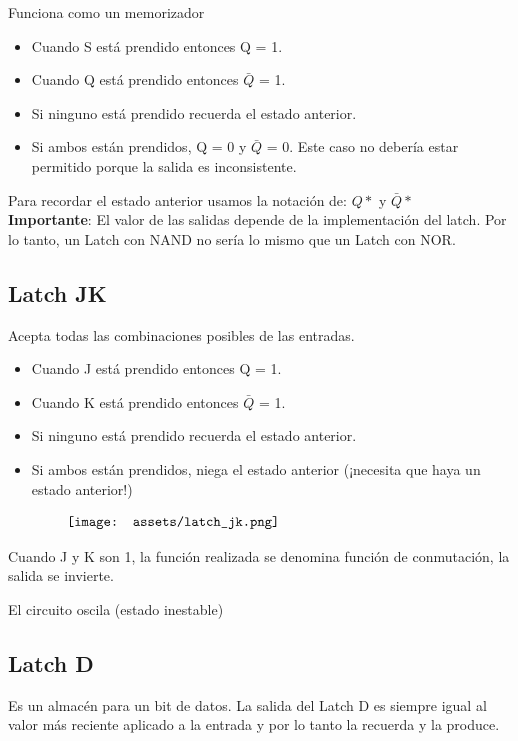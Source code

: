 \documentclass[10pt,a4paper]{article}
\begin{document}
Funciona como un memorizador
\begin{itemize}
    \item Cuando S está prendido entonces Q = 1.
    \item Cuando Q está prendido entonces \(\bar{Q}\) = 1.
    \item Si ninguno está prendido recuerda el estado anterior. 
    \item Si ambos están prendidos, Q = 0 y \(\bar{Q}\) = 0. Este caso no debería estar permitido porque la salida es inconsistente.
\end{itemize}

Para recordar el estado anterior usamos la notación de: \(Q \ast\) y \(\bar{Q} \ast \) \\

\textbf{Importante}: El valor de las salidas depende de la implementación del latch. Por lo tanto, un Latch con NAND no sería lo mismo que un Latch con NOR.

\subsection*{Latch JK}
Acepta todas las combinaciones posibles de las entradas.
\begin{itemize}
    \item Cuando J está prendido entonces Q = 1.
    \item Cuando K está prendido entonces \(\bar{Q}\) = 1.
    \item Si ninguno está prendido recuerda el estado anterior. 
    \item Si ambos están prendidos, niega el estado anterior (¡necesita que haya un estado anterior!)
\end{itemize}

\[\begin{minipage}[b]{0.8\textwidth}
    \texttt{[image: assets/latch\_jk.png]}
    \label{fig:latch_jk}
\end{minipage}\]

Cuando J y K son 1, la función realizada se denomina función de conmutación, la salida se invierte. 

El circuito oscila (estado inestable)

\subsection*{Latch D}
Es un almacén para un bit de datos. La salida del Latch D es siempre igual al valor más reciente aplicado a la entrada y por lo tanto la recuerda y la produce.
\end{document}
